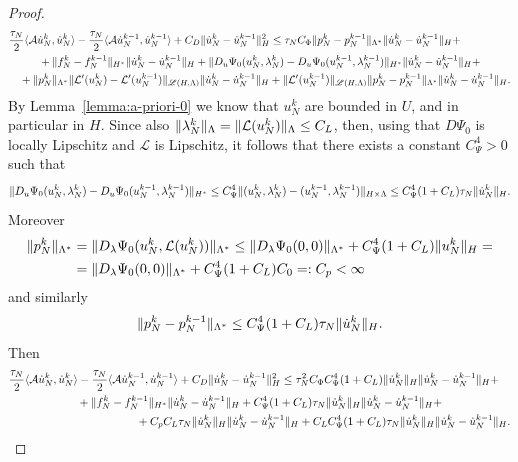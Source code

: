 \documentclass[a4paper,10pt,twoside]{amsbook}
\numberwithin{section}{chapter}
\numberwithin{equation}{chapter}
\theoremstyle{definition}
\DeclarePairedDelimiter{\norm}{\lVert}{\rVert}
\DeclarePairedDelimiter{\dual}{\langle}{\rangle}
\begin{document}
\begin{proof}
\[\begin{multlined}
\frac{\tau_N}{2}\dual{\mathcal{A}\dot u_N^k,\dot u_N^k}-\frac{\tau_N}{2}\dual{\mathcal{A}\dot u_N^{k-1},\dot u_N^{k-1}}+C_D\norm{\dot u_N^k-\dot u_N^{k-1}}_H^2\le\tau_NC_\Phi\norm{p_N^k-p_N^{k-1}}_{\Lambda^*}\norm{\dot u_N^k-\dot u_N^{k-1}}_H+\\
+\norm{f_N^k-f_N^{k-1}}_{H^*}\norm{\dot u_N^k-\dot u_N^{k-1}}_H+\norm{D_u\Psi_0(u_N^k,\lambda_N^k)-D_u\Psi_0(u_N^{k-1},\lambda_N^{k-1})}_{H^*}\norm{\dot u_N^k-\dot u_N^{k-1}}_H+\\
+\norm{p_N^k}_{\Lambda^*}\norm{\mathcal{L}'(u_N^k)-\mathcal{L}'(u_N^{k-1})}_{\mathscr{L}(H,\Lambda)}\norm{\dot u_N^k-\dot u_N^{k-1}}_H+\norm{\mathcal{L}'(u_N^{k-1})}_{\mathscr{L}(H,\Lambda)}\norm{p_N^k-p_N^{k-1}}_{\Lambda^*}\norm{\dot u_N^k-\dot u_N^{k-1}}_H.
\end{multlined}
\]
By Lemma~\ref{lemma:a-priori-0} we know that $u_N^k$ are bounded in $U$, and in particular in $H$. Since also $\norm{\lambda_N^k}_\Lambda=\norm{\mathcal{L}(u_N^k)}_\Lambda\le C_L$, then, using that $D\Psi_0$ is locally Lipschitz and $\mathcal{L}$ is Lipschitz, it follows that there exists a constant $C_\Psi^4>0$ such that
\[
\norm{D_u\Psi_0(u_N^k,\lambda_N^k)-D_u\Psi_0(u_N^{k-1},\lambda_N^{k-1})}_{H^*}\le C_\Psi^4\norm{(u_N^k,\lambda_N^k)-(u_N^{k-1},\lambda_N^{k-1})}_{H\times\Lambda}\le C_\Psi^4(1+C_L)\tau_N\norm{\dot u_N^k}_H.
\]
Moreover
\[
\begin{split}
\norm{p_N^k}_{\Lambda^*}&=\norm{D_\lambda\Psi_0(u_N^k,\mathcal{L}(u_N^k))}_{\Lambda^*}\le\norm{D_\lambda\Psi_0(0,0)}_{\Lambda^*}+C_\Psi^4(1+C_L)\norm{u_N^k}_H=\\
&=\norm{D_\lambda\Psi_0(0,0)}_{\Lambda^*}+C_\Psi^4(1+C_L)C_0=:C_p<\infty
\end{split}
\]
and similarly
\[
\norm{p_N^k-p_N^{k-1}}_{\Lambda^*}\le C_\Psi^4(1+C_L)\tau_N\norm{\dot u_N^k}_H.
\]
Then
\[
\begin{multlined}
\frac{\tau_N}{2}\dual{\mathcal{A}\dot u_N^k,\dot u_N^k}-\frac{\tau_N}{2}\dual{\mathcal{A}\dot u_N^{k-1},\dot u_N^{k-1}}+C_D\norm{\dot u_N^k-\dot u_N^{k-1}}_H^2\le\tau_N^2C_\Phi C_\Psi^4(1+C_L)\norm{\dot u_N^k}_H\norm{\dot u_N^k-\dot u_N^{k-1}}_H+\\
+\norm{f_N^k-f_N^{k-1}}_{H^*}\norm{\dot u_N^k-\dot u_N^{k-1}}_H+C_\Psi^4(1+C_L)\tau_N\norm{\dot u_N^k}_H\norm{\dot u_N^k-\dot u_N^{k-1}}_H+\\
+C_pC_L\tau_N\norm{\dot u_N^k}_H\norm{\dot u_N^k-\dot u_N^{k-1}}_H+C_LC_\Psi^4(1+C_L)\tau_N\norm{\dot u_N^k}_H\norm{\dot u_N^k-\dot u_N^{k-1}}_H.
\end{multlined}
\]

\end{proof}
\end{document}
